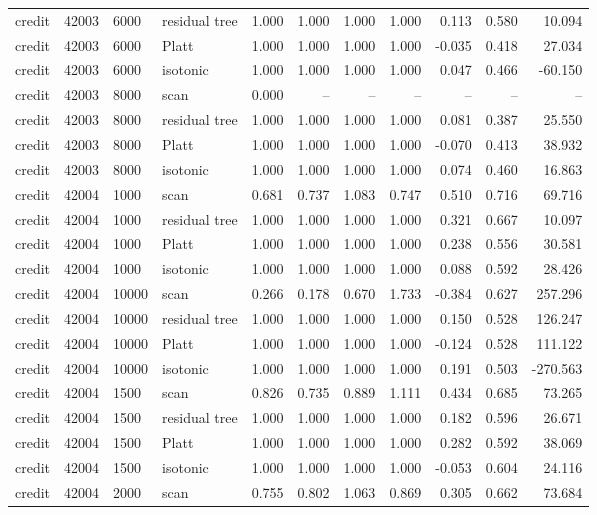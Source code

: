 \begin{tabular}{lrllrrrrrrr}
credit & 42003 & 6000 & residual tree & 1.000 & 1.000 & 1.000 & 1.000 & 0.113 & 0.580 & 10.094 \\
credit & 42003 & 6000 & Platt & 1.000 & 1.000 & 1.000 & 1.000 & -0.035 & 0.418 & 27.034 \\
credit & 42003 & 6000 & isotonic & 1.000 & 1.000 & 1.000 & 1.000 & 0.047 & 0.466 & -60.150 \\
credit & 42003 & 8000 & scan & 0.000 & -- & -- & -- & -- & -- & -- \\
credit & 42003 & 8000 & residual tree & 1.000 & 1.000 & 1.000 & 1.000 & 0.081 & 0.387 & 25.550 \\
credit & 42003 & 8000 & Platt & 1.000 & 1.000 & 1.000 & 1.000 & -0.070 & 0.413 & 38.932 \\
credit & 42003 & 8000 & isotonic & 1.000 & 1.000 & 1.000 & 1.000 & 0.074 & 0.460 & 16.863 \\
credit & 42004 & 1000 & scan & 0.681 & 0.737 & 1.083 & 0.747 & 0.510 & 0.716 & 69.716 \\
credit & 42004 & 1000 & residual tree & 1.000 & 1.000 & 1.000 & 1.000 & 0.321 & 0.667 & 10.097 \\
credit & 42004 & 1000 & Platt & 1.000 & 1.000 & 1.000 & 1.000 & 0.238 & 0.556 & 30.581 \\
credit & 42004 & 1000 & isotonic & 1.000 & 1.000 & 1.000 & 1.000 & 0.088 & 0.592 & 28.426 \\
credit & 42004 & 10000 & scan & 0.266 & 0.178 & 0.670 & 1.733 & -0.384 & 0.627 & 257.296 \\
credit & 42004 & 10000 & residual tree & 1.000 & 1.000 & 1.000 & 1.000 & 0.150 & 0.528 & 126.247 \\
credit & 42004 & 10000 & Platt & 1.000 & 1.000 & 1.000 & 1.000 & -0.124 & 0.528 & 111.122 \\
credit & 42004 & 10000 & isotonic & 1.000 & 1.000 & 1.000 & 1.000 & 0.191 & 0.503 & -270.563 \\
credit & 42004 & 1500 & scan & 0.826 & 0.735 & 0.889 & 1.111 & 0.434 & 0.685 & 73.265 \\
credit & 42004 & 1500 & residual tree & 1.000 & 1.000 & 1.000 & 1.000 & 0.182 & 0.596 & 26.671 \\
credit & 42004 & 1500 & Platt & 1.000 & 1.000 & 1.000 & 1.000 & 0.282 & 0.592 & 38.069 \\
credit & 42004 & 1500 & isotonic & 1.000 & 1.000 & 1.000 & 1.000 & -0.053 & 0.604 & 24.116 \\
credit & 42004 & 2000 & scan & 0.755 & 0.802 & 1.063 & 0.869 & 0.305 & 0.662 & 73.684 \\

\end{tabular}
